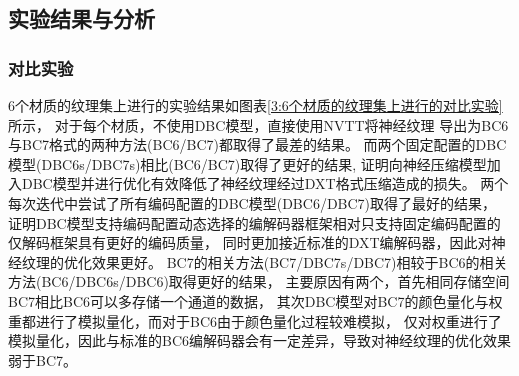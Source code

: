 \subsection{实验结果与分析}

\subsubsection{对比实验}
\label{3:对比实验}
6个材质的纹理集上进行的实验结果如图表\ref{3:6个材质的纹理集上进行的对比实验}所示，
对于每个材质，不使用DBC模型，直接使用NVTT将神经纹理
导出为BC6与BC7格式的两种方法(BC6/BC7)都取得了最差的结果。
而两个固定配置的DBC模型(DBC6s/DBC7s)相比(BC6/BC7)取得了更好的结果,
证明向神经压缩模型加入DBC模型并进行优化有效降低了神经纹理经过DXT格式压缩造成的损失。
两个每次迭代中尝试了所有编码配置的DBC模型(DBC6/DBC7)取得了最好的结果，
证明DBC模型支持编码配置动态选择的编解码器框架相对只支持固定编码配置的仅解码框架具有更好的编码质量，
同时更加接近标准的DXT编解码器，因此对神经纹理的优化效果更好。
BC7的相关方法(BC7/DBC7s/DBC7)相较于BC6的相关方法(BC6/DBC6s/DBC6)取得更好的结果，
主要原因有两个，首先相同存储空间BC7相比BC6可以多存储一个通道的数据，
其次DBC模型对BC7的颜色量化与权重都进行了模拟量化，而对于BC6由于颜色量化过程较难模拟，
仅对权重进行了模拟量化，因此与标准的BC6编解码器会有一定差异，导致对神经纹理的优化效果弱于BC7。




